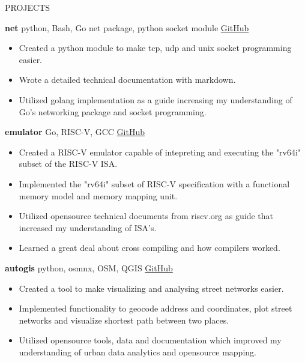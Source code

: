 \documentclass{resume} %
\begin{document}
\begin{rSection}{PROJECTS}
\vspace{-1.25em}
\item \textbf{net} {python, Bash, Go net package, python socket module} \hfill \href{https://github.com/Joe-Degs/net}{GitHub}
\begin{itemize}
    \itemsep -3pt {} 
     \item Created a python module to make tcp, udp and unix socket programming easier.
    \item Wrote a detailed technical documentation with markdown.
    \item Utilized golang implementation as a guide increasing my understanding of Go's networking package and socket programming.
 \end{itemize}

\item \textbf{emulator} {Go, RISC-V, GCC} \hfill \href{https://github.com/Joe-Degs/emulator}{GitHub}
\begin{itemize}
    \itemsep -3pt {} 
     \item Created a RISC-V emulator capable of intepreting and executing the "rv64i" subset of the RISC-V ISA.
    \item Implemented the "rv64i" subset of RISC-V specification with a functional memory model and memory mapping unit.
    \item Utilized opensource technical documents from riscv.org as guide that increased my understanding of ISA's.
    \item Learned a great deal about cross compiling and how compilers worked.
 \end{itemize}

\item \textbf{autogis} {python, osmnx, OSM, QGIS} \hfill \href{https://github.com/Joe-Degs/AutoGIS/tree/master/test-thesis/autogis}{GitHub}
\begin{itemize}
    \itemsep -3pt {} 
     \item Created a tool to make visualizing and analysing street networks easier.
    \item Implemented functionality to geocode address and coordinates, plot street networks and visualize shortest path between two places.
    \item Utilized opensource tools, data and documentation which improved my understanding of urban data analytics and opensource mapping.
 \end{itemize}
\end{rSection} 
\end{document}
